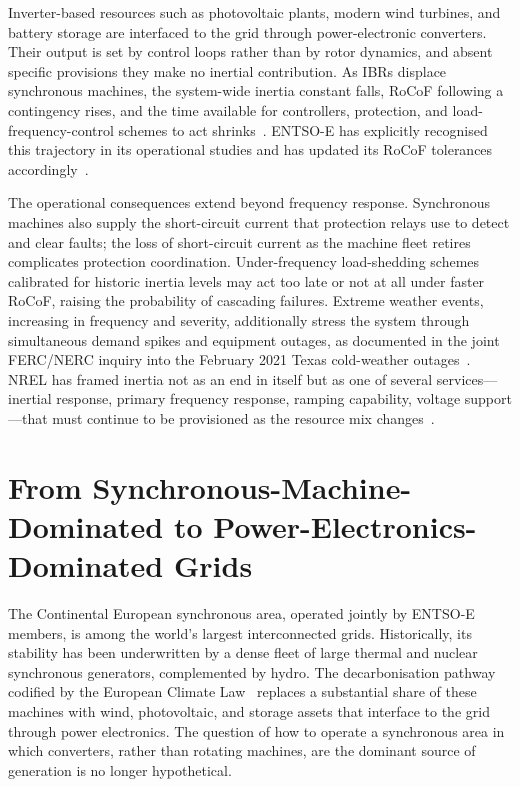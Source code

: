 \documentclass[conference]{IEEEtran}
\begin{document}
Inverter-based resources such as photovoltaic plants, modern wind turbines, and battery storage are interfaced to the grid through power-electronic converters. Their output is set by control loops rather than by rotor dynamics, and absent specific provisions they make no inertial contribution. As IBRs displace synchronous machines, the system-wide inertia constant falls, RoCoF following a contingency rises, and the time available for controllers, protection, and load-frequency-control schemes to act shrinks~\cite{tielens2016relevance,ulbig2014impact,milano2018foundations}. ENTSO-E has explicitly recognised this trajectory in its operational studies and has updated its RoCoF tolerances accordingly~\cite{entsoe2020inertia}.

The operational consequences extend beyond frequency response. Synchronous machines also supply the short-circuit current that protection relays use to detect and clear faults; the loss of short-circuit current as the machine fleet retires complicates protection coordination. Under-frequency load-shedding schemes calibrated for historic inertia levels may act too late or not at all under faster RoCoF, raising the probability of cascading failures. Extreme weather events, increasing in frequency and severity, additionally stress the system through simultaneous demand spikes and equipment outages, as documented in the joint FERC/NERC inquiry into the February 2021 Texas cold-weather outages~\cite{fercnerc2021texas}. NREL has framed inertia not as an end in itself but as one of several services---inertial response, primary frequency response, ramping capability, voltage support---that must continue to be provisioned as the resource mix changes~\cite{denholm2020inertia,nerc2015erstf}.

\section{From Synchronous-Machine-Dominated to Power-Electronics-Dominated Grids}\label{sec:transition}
The Continental European synchronous area, operated jointly by ENTSO-E members, is among the world's largest interconnected grids. Historically, its stability has been underwritten by a dense fleet of large thermal and nuclear synchronous generators, complemented by hydro. The decarbonisation pathway codified by the European Climate Law~\cite{eu2021climatelaw} replaces a substantial share of these machines with wind, photovoltaic, and storage assets that interface to the grid through power electronics. The question of how to operate a synchronous area in which converters, rather than rotating machines, are the dominant source of generation is no longer hypothetical.
\end{document}
